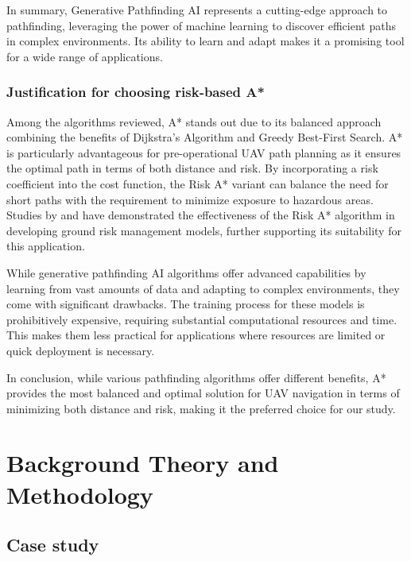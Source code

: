 \documentclass[12pt]{report}
\begin{document}
        In summary, Generative Pathfinding AI represents a cutting-edge approach to pathfinding, leveraging the power
        of machine learning to discover efficient paths in complex environments. Its ability to learn and adapt makes it
        a promising tool for a wide range of applications.

        \subsection{Justification for choosing risk-based A*}
        Among the algorithms reviewed, A* stands out due to its balanced approach combining the benefits of Dijkstra's
        Algorithm and Greedy Best-First Search. A* is particularly advantageous for pre-operational UAV path planning as
        it ensures the optimal path in terms of both distance and risk. By incorporating a risk coefficient into the
        cost function, the Risk A* variant can balance the need for short paths with the requirement to minimize
        exposure to hazardous areas. Studies by \cite{primatesta_ground_2020} and \cite{clothier_casualty_2007} have
        demonstrated the effectiveness of the Risk A* algorithm in developing ground risk management models, further
        supporting its suitability for this application.
            
        While generative pathfinding AI algorithms offer advanced capabilities by learning from vast amounts of data and
        adapting to complex environments, they come with significant drawbacks. The training process for these models is
        prohibitively expensive, requiring substantial computational resources and time. This makes them less practical
        for applications where resources are limited or quick deployment is necessary.
            
        In conclusion, while various pathfinding algorithms offer different benefits, A* provides the most balanced and
        optimal solution for UAV navigation in terms of minimizing both distance and risk, making it the preferred
        choice for our study.

\chapter{Background Theory and Methodology}
    \section{Case study}
\end{document}

